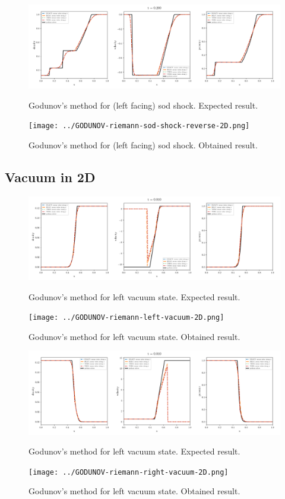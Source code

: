     \begin{figure}[htbp]
        \centering
        \includegraphics[width=.9\textwidth]{./figures/GODUNOV-riemann-sod-shock-reverse-2D.png}%
        \caption{Godunov's method for (left facing) sod shock. Expected result.}
        \texttt{[image: ../GODUNOV-riemann-sod-shock-reverse-2D.png]}%
        \caption{Godunov's method for (left facing) sod shock. Obtained result.}
    \end{figure}










\clearpage
\subsection{Vacuum in 2D}

    \begin{figure}[htbp]
        \centering
        \includegraphics[width=.9\textwidth]{./figures/GODUNOV-riemann-left-vacuum-2D.png}%
        \caption{Godunov's method for left vacuum state. Expected result.}
        \texttt{[image: ../GODUNOV-riemann-left-vacuum-2D.png]}
        \caption{Godunov's method for left vacuum state. Obtained result.}
    \end{figure}


    \begin{figure}[htbp]
        \centering
        \includegraphics[width=.9\textwidth]{./figures/GODUNOV-riemann-right-vacuum-2D.png}%
        \caption{Godunov's method for left vacuum state. Expected result.}
        \texttt{[image: ../GODUNOV-riemann-right-vacuum-2D.png]}
        \caption{Godunov's method for left vacuum state. Obtained result.}
    \end{figure}


